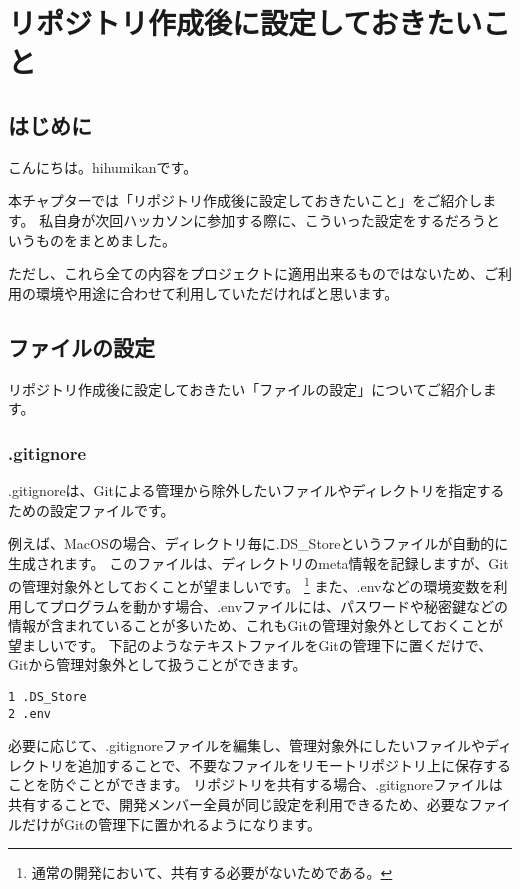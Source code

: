 \chapter{リポジトリ作成後に設定しておきたいこと}
\section{はじめに}
こんにちは。hihumikanです。

本チャプターでは「リポジトリ作成後に設定しておきたいこと」をご紹介します。
私自身が次回ハッカソンに参加する際に、こういった設定をするだろうというものをまとめました。

ただし、これら全ての内容をプロジェクトに適用出来るものではないため、ご利用の環境や用途に合わせて利用していただければと思います。

\section{ファイルの設定}
リポジトリ作成後に設定しておきたい「ファイルの設定」についてご紹介します。

\subsection{.gitignore}
.gitignoreは、Gitによる管理から除外したいファイルやディレクトリを指定するための設定ファイルです。

例えば、MacOSの場合、ディレクトリ毎に.DS\_Storeというファイルが自動的に生成されます。
このファイルは、ディレクトリのmeta情報を記録しますが、Gitの管理対象外としておくことが望ましいです。
\footnote{通常の開発において、共有する必要がないためである。}
また、.envなどの環境変数を利用してプログラムを動かす場合、.envファイルには、パスワードや秘密鍵などの情報が含まれていることが多いため、これもGitの管理対象外としておくことが望ましいです。
下記のようなテキストファイルをGitの管理下に置くだけで、Gitから管理対象外として扱うことができます。

\begin{tcolorbox}[title=.gitignore]
  \begin{verbatim}
1 .DS_Store
2 .env
\end{verbatim}
\end{tcolorbox}

必要に応じて、.gitignoreファイルを編集し、管理対象外にしたいファイルやディレクトリを追加することで、不要なファイルをリモートリポジトリ上に保存することを防ぐことができます。
リポジトリを共有する場合、.gitignoreファイルは共有することで、開発メンバー全員が同じ設定を利用できるため、必要なファイルだけがGitの管理下に置かれるようになります。

